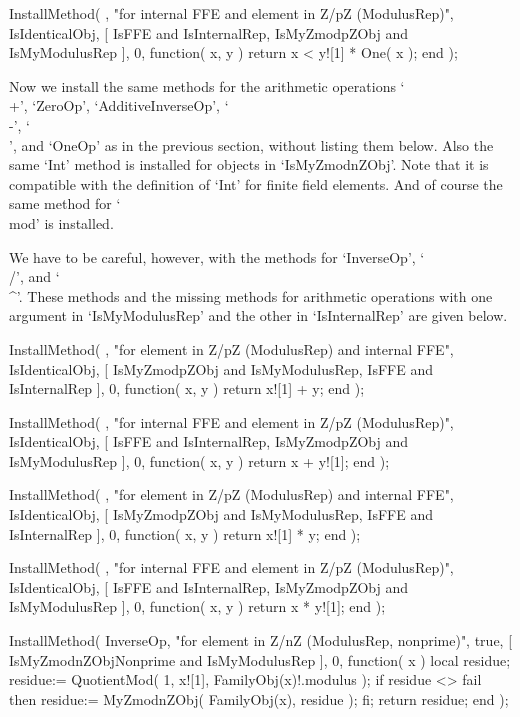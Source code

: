 InstallMethod( \<,
    "for internal FFE and element in Z/pZ (ModulusRep)",
    IsIdenticalObj,
    [ IsFFE and IsInternalRep, IsMyZmodpZObj and IsMyModulusRep ], 0,
    function( x, y )
    return x < y![1] * One( x );
    end );
\endtt

Now we install the same methods for the arithmetic operations
`\\+', `ZeroOp', `AdditiveInverseOp', `\\-', `\\\*', and `OneOp'
as in the previous section, without listing them below.
Also the same `Int' method is installed for objects in `IsMyZmodnZObj'.
Note that it is compatible with the definition of `Int' for finite
field elements.
And of course the same method for `\\mod' is installed.

We have to be careful, however, with the methods for `InverseOp',
`\\/', and `\\^'.
These methods and the missing methods for arithmetic operations with
one argument in `IsMyModulusRep' and the other in `IsInternalRep'
are given below.

\begintt
InstallMethod( \+,
    "for element in Z/pZ (ModulusRep) and internal FFE",
    IsIdenticalObj,
    [ IsMyZmodpZObj and IsMyModulusRep, IsFFE and IsInternalRep ], 0,
    function( x, y ) return x![1] + y; end );

InstallMethod( \+,
    "for internal FFE and element in Z/pZ (ModulusRep)",
    IsIdenticalObj,
    [ IsFFE and IsInternalRep, IsMyZmodpZObj and IsMyModulusRep ], 0,
    function( x, y ) return x + y![1]; end );

InstallMethod( \*,
    "for element in Z/pZ (ModulusRep) and internal FFE",
    IsIdenticalObj,
    [ IsMyZmodpZObj and IsMyModulusRep, IsFFE and IsInternalRep ], 0,
    function( x, y ) return x![1] * y; end );

InstallMethod( \*,
    "for internal FFE and element in Z/pZ (ModulusRep)",
    IsIdenticalObj,
    [ IsFFE and IsInternalRep, IsMyZmodpZObj and IsMyModulusRep ], 0,
    function( x, y ) return x * y![1]; end );

InstallMethod( InverseOp,
    "for element in Z/nZ (ModulusRep, nonprime)",
    true,
    [ IsMyZmodnZObjNonprime and IsMyModulusRep ], 0,
    function( x )
    local residue;
    residue:= QuotientMod( 1, x![1], FamilyObj(x)!.modulus );
    if residue <> fail then
      residue:= MyZmodnZObj( FamilyObj(x), residue );
    fi;
    return residue;
    end );

